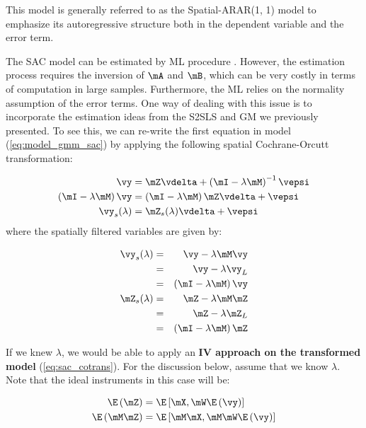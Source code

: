 \documentclass[english,12pt]{book}\usepackage[]{graphicx}\usepackage[]{xcolor}
\begin{document}
\begin{remark}
This model is generally referred to as the Spatial-ARAR(1, 1) model to emphasize its autoregressive structure both in the dependent variable and the error term. 
\end{remark}

The SAC model can be estimated by ML procedure \citep[see][]{anselin1988spatial}. However, the estimation process requires the inversion of $\mA$ and $\mB$, which can be very costly in terms of computation in large samples. Furthermore, the ML relies on the normality assumption of the error terms.  One way of dealing with this issue is to incorporate the estimation ideas from the S2SLS and GM we previously presented. To see this, we can re-write the first equation in model (\ref{eq:model_gmm_sac}) by applying the following spatial Cochrane-Orcutt transformation: 

\begin{equation}\label{eq:sac_cotrans}
	\begin{aligned}
	\vy & = \mZ\vdelta + \left(\mI - \lambda \mM\right)^{-1}\vepsi \\
	\left(\mI - \lambda \mM\right)\vy & = \left(\mI - \lambda \mM\right) \mZ\vdelta + \vepsi \\
	\vy_s(\lambda) & = \mZ_s(\lambda)\vdelta + \vepsi 
	\end{aligned}
\end{equation}
%
where the spatially filtered variables are given by:

\begin{eqnarray*}
\vy_s(\lambda) & = & \vy - \lambda \mM\vy \\
      & = & \vy - \lambda \vy_L \\
      & = & \left(\mI - \lambda \mM\right)\vy \\
\mZ_s(\lambda) & = & \mZ - \lambda \mM \mZ \\
      & = & \mZ - \lambda \mZ_L \\
      & = & \left(\mI - \lambda \mM\right) \mZ \\
\end{eqnarray*}

If we knew $\lambda$, we would be able to apply an \textbf{IV approach on the transformed model} (\ref{eq:sac_cotrans}). For the discussion below, assume that we know $\lambda$. Note that the ideal instruments in this case will be:

\begin{equation*}
  \begin{aligned}
    \E\left(\mZ\right)    & = \E\left[\mX, \mW\E\left(\vy\right)\right] \\
    \E\left(\mM\mZ\right) & = \E\left[\mM\mX, \mM\mW\E\left(\vy\right)\right]
  \end{aligned}
\end{equation*}
\end{document}
